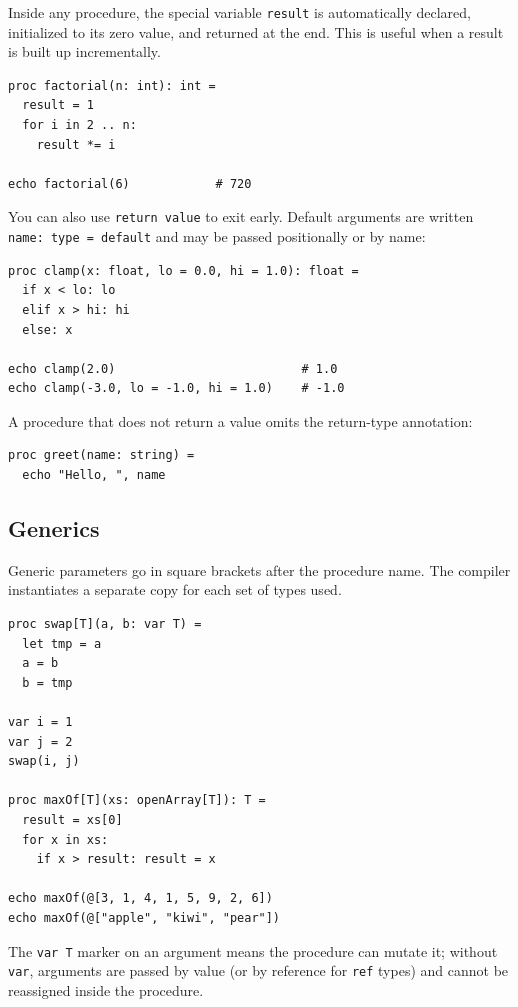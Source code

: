 \documentclass[justified, sixbynine]{tufte-book}
\def\ft{\small\tt}
\theoremstyle{plain}%
\newtheorem * {corollary}{Corollary}
\theoremstyle{definition}
\theoremstyle{remark}
\newtheorem * {remark}{Remark}
\newtheorem * {note}{Note}
\begin{document}
\begin{fullwidth}
Inside any procedure, the special variable {\ft result} is automatically declared, initialized to its zero value, and returned at the end. This is useful when a result is built up incrementally.

\begin{lstlisting}
proc factorial(n: int): int =
  result = 1
  for i in 2 .. n:
    result *= i

echo factorial(6)            # 720
\end{lstlisting}

You can also use {\ft return value} to exit early. Default arguments are written {\ft name: type = default} and may be passed positionally or by name:

\begin{lstlisting}
proc clamp(x: float, lo = 0.0, hi = 1.0): float =
  if x < lo: lo
  elif x > hi: hi
  else: x

echo clamp(2.0)                          # 1.0
echo clamp(-3.0, lo = -1.0, hi = 1.0)    # -1.0
\end{lstlisting}

A procedure that does not return a value omits the return-type annotation:

\begin{lstlisting}
proc greet(name: string) =
  echo "Hello, ", name
\end{lstlisting}

\goodbreak\subsection{Generics}


Generic parameters go in square brackets after the procedure name. The compiler instantiates a separate copy for each set of types used.

\begin{lstlisting}
proc swap[T](a, b: var T) =
  let tmp = a
  a = b
  b = tmp

var i = 1
var j = 2
swap(i, j)

proc maxOf[T](xs: openArray[T]): T =
  result = xs[0]
  for x in xs:
    if x > result: result = x

echo maxOf(@[3, 1, 4, 1, 5, 9, 2, 6])
echo maxOf(@["apple", "kiwi", "pear"])
\end{lstlisting}

The {\ft var T} marker on an argument means the procedure can mutate it; without {\ft var}, arguments are passed by value (or by reference for {\ft ref} types) and cannot be reassigned inside the procedure.


\end{fullwidth}
\end{document}
